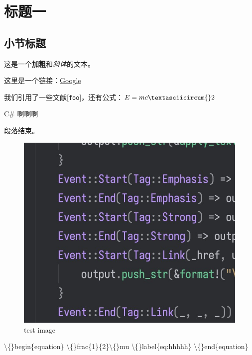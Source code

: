\chapter{标题一}
\section{小节标题}
这是一个\textbf{加粗}和\textit{斜体}的文本。

这里是一个链接：\href{https://www.google.com}{Google}

我们引用了一些文献[\texttt{foo}]，还有公式：$E = mc\textasciicircum{}2$

C\# 啊啊啊

段落结束。

\begin{figure}[h]
\includegraphics{images/test.jpg}
\caption{test image}
\label{fig:images/test.jpg}
\end{figure}


\textbackslash\{\}begin\{equation\}
\textbackslash\{\}frac\{1\}\{2\}\textbackslash\{\}mu
\textbackslash\{\}label\{eq:hhhhh\}
\textbackslash\{\}end\{equation\}


